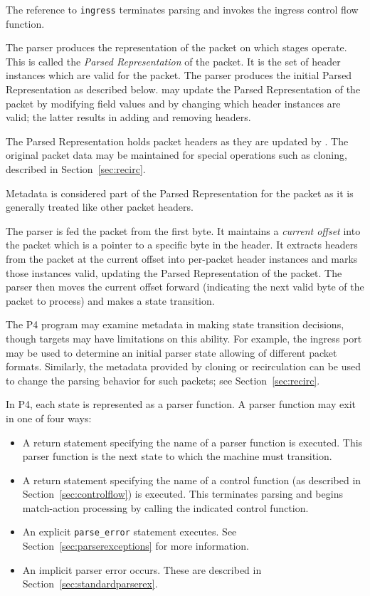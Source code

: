 \documentclass[12pt]{article}
\begin{document}
The reference to \texttt{ingress} terminates parsing and invokes the ingress control 
flow function.


The parser produces the representation of the packet on which \matchaction 
stages operate. This is called the \textit{Parsed Representation} of the packet. 
It is the set of header instances which are valid for the packet. The parser 
produces the initial Parsed Representation as described below. \Matchaction 
may update the Parsed Representation of the packet by modifying field values 
and by changing which header instances are valid; the latter results in adding 
and removing headers. 

The Parsed Representation holds packet headers as they are updated by \matchaction. 
The original packet data may be maintained for special operations such as 
cloning, described in Section~\ref{sec:recirc}.

Metadata is considered part of the Parsed Representation for the packet as 
it is generally treated like other packet headers.


The parser is fed the packet from the first byte. It maintains a \textit{current 
offset} into the packet which is a pointer to a specific byte in the header. It 
extracts headers from the packet at the current offset into per-packet header 
instances and marks those instances valid, updating the Parsed Representation 
of the packet. The parser then moves the current offset forward (indicating 
the next valid byte of the packet to process) and makes a state transition.

The P4 program may examine metadata in making state transition decisions, 
though targets may have limitations on this ability.  For example, the ingress 
port may be used to determine an initial parser state allowing of different 
packet formats. Similarly, the metadata provided by cloning or recirculation 
can be used to change the parsing behavior for such packets; see 
Section~\ref{sec:recirc}.

In P4, each state is represented as a parser function. A parser function may 
exit in one of four ways:

\begin{itemize}
\item
A return statement specifying the name of a parser function is executed.  This 
parser function is the next state to which the machine must transition.
\item
A return statement specifying the name of a control function (as described 
in Section~\ref{sec:controlflow}) is executed. This terminates 
parsing and begins match-action processing by calling the indicated control 
function.
\item
An explicit \texttt{parse_error} statement executes. 
See Section~\ref{sec:parserexceptions} for more information.
\item
An implicit parser error occurs. These are described in 
Section~\ref{sec:standardparserex}.
\end{itemize}
\end{document}

